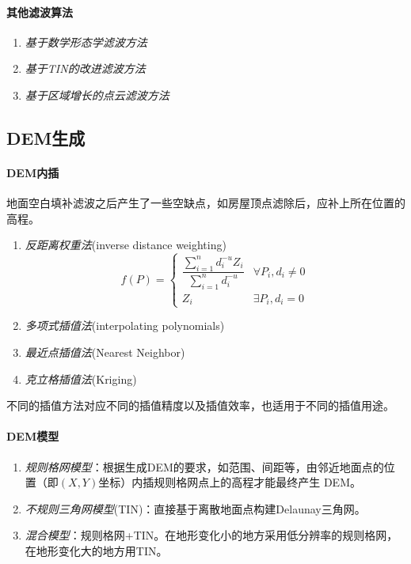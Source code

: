 \paragraph{其他滤波算法}
\begin{enumerate}
	\item \textit{基于数学形态学滤波方法}
	\item \textit{基于TIN的改进滤波方法}
	\item \textit{基于区域增长的点云滤波方法}
\end{enumerate}

\subsection{DEM生成}
\paragraph{DEM内插}地面空白填补滤波之后产生了一些空缺点，如房屋顶点滤除后，应补上所在位置的高程。
\begin{enumerate}
	\item \textit{反距离权重法}(inverse distance weighting)
		\begin{equation}
		f(P) = \left\lbrace \begin{array}{ll}
		\dfrac{\displaystyle{\sum_{i=1}^{n} d_i^{-u} Z_i}}{\displaystyle{\sum_{i=1}^{n} d_i^{-u}}} & ∀P_i,d_i \neq 0 \\
		Z_i & ∃P_i,d_i = 0
		\end{array} \right.
		\end{equation}
	\item \textit{多项式插值法}(interpolating polynomials)
	\item \textit{最近点插值法}(Nearest Neighbor)
	\item \textit{克立格插值法}(Kriging)
\end{enumerate}
不同的插值方法对应不同的插值精度以及插值效率，也适用于不同的插值用途。

\paragraph{DEM模型}
\begin{enumerate}
	\item \textit{规则格网模型}：根据生成DEM的要求，如范围、间距等，由邻近地面点的位置（即$ (X,Y) $坐标）内插规则格网点上的高程才能最终产生 DEM。
	\item \textit{不规则三角网模型}(TIN)：直接基于离散地面点构建Delaunay三角网。
	\item \textit{混合模型}：规则格网+TIN。在地形变化小的地方采用低分辨率的规则格网，在地形变化大的地方用TIN。
\end{enumerate}

